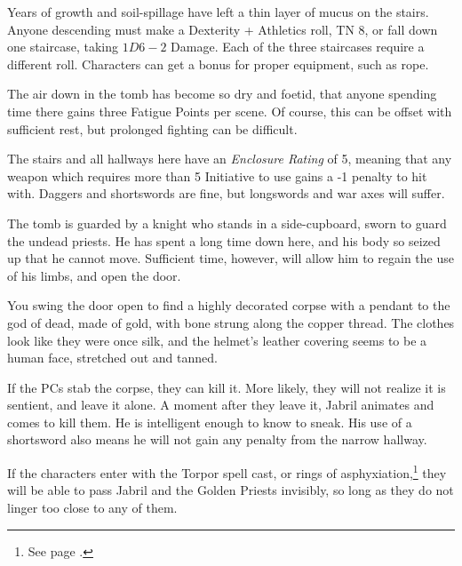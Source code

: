 \begin{multicols}{2}
\begin{itemize}
\end{itemize}

\label{underGreenTower}

Years of growth and soil-spillage have left a thin layer of mucus on the stairs.
Anyone descending must make a Dexterity + Athletics roll, TN 8, or fall down one staircase, taking $1D6-2$ Damage.
Each of the three staircases require a different roll.
Characters can get a bonus for proper equipment, such as rope.

The air down in the tomb has become so dry and foetid, that anyone spending time there gains three Fatigue Points per scene.
Of course, this can be offset with sufficient rest, but prolonged fighting can be difficult.

The stairs and all hallways here have an \textit{Enclosure Rating} of 5, meaning that any weapon which requires more than 5 Initiative to use gains a -1 penalty to hit with.
Daggers and shortswords are fine, but longswords and war axes will suffer.


The tomb is guarded by a knight who stands in a side-cupboard, sworn to guard the undead priests.
He has spent a long time down here, and his body so seized up that he cannot move.
Sufficient time, however, will allow him to regain the use of his limbs, and open the door.

\begin{boxtext}

  You swing the door open to find a highly decorated corpse with a pendant to the god of dead, made of gold, with bone strung along the copper thread.
  The clothes look like they were once silk, and the helmet's leather covering seems to be a human face, stretched out and tanned.

\end{boxtext}

If the PCs stab the corpse, they can kill it.
More likely, they will not realize it is sentient, and leave it alone.
A moment after they leave it, Jabril animates and comes to kill them.
He is intelligent enough to know to sneak.
His use of a shortsword also means he will not gain any penalty from the narrow hallway.

If the characters enter with the Torpor spell cast, or rings of asphyxiation,\footnote{See page \pageref{ring_asphyxiation}.} they will be able to pass Jabril and the Golden Priests invisibly, so long as they do not linger too close to any of them.


\end{multicols}
